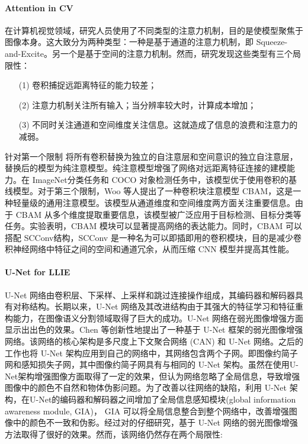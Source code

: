 \documentclass[a4paper, 10pt]{article}
\begin{document}
	\paragraph{Attention in CV}
	
	在计算机视觉领域，研究人员使用了不同类型的注意力机制，目的是使模型聚焦于图像本身。这大致分为两种类型：一种是基于通道的注意力机制，即 Squeeze-and-Excite。另一个是基于空间的注意力机制\cite{woo2018cbam}。然而，研究发现这些类型有三个局限性：
	
	\begin{itemize}
		\item[(1)] 
		卷积捕捉远距离特征的能力较差；
		
		\item[(2)]
		注意力机制关注所有输入；当分辨率较大时，计算成本增加；
		
		\item[(3)]
		不同时关注通道和空间维度关注信息。这就造成了信息的浪费和注意力的减弱。
	\end{itemize}	
	
	针对第一个限制 \cite{ramachandran2019stand} 将所有卷积替换为独立的自注意层和空间意识的独立自注意层，替换后的模型为纯注意模型。纯注意模型增强了网络对远距离特征连接的建模能力。在 ImageNet分类任务和 COCO 对象检测任务中，该模型优于使用卷积的基线模型。对于第三个限制，Woo 等人\cite{woo2018cbam}提出了一种卷积块注意模型 CBAM，这是一种轻量级的通用注意模型。该模型从通道维度和空间维度两方面关注重要信息。由于 CBAM 从多个维度提取重要信息，该模型被广泛应用于目标检测、目标分类等任务。实验表明，CBAM 模块可以显著提高网络的表达能力。同时，CBAM 可以搭配 SCConv\cite{li2023scconv}结构，SCConv 是一种名为可以即插即用的卷积模块，目的是减少卷积神经网络中特征之间的空间和通道冗余，从而压缩 CNN 模型并提高其性能。
	
	\paragraph{U-Net for LLIE}
	
	U-Net 网络由卷积层、下采样、上采样和跳过连接操作组成，其编码器和解码器具有对称结构。长期以来，U-Net 网络及其改进结构由于其强大的特征学习和特征重构能力，在图像语义分割领域取得了巨大的成功。U-Net 网络在弱光图像增强方面显示出出色的效果。Chen 等\cite{chen2018learning}创新性地提出了一种基于 U-Net 框架的弱光图像增强网络。该网络的核心架构是多尺度上下文聚合网络 (CAN) 和 U-Net 网络。之后的工作\cite{chen2018learning, zamir2021learning}也将 U-Net 架构应用到自己的网络中，其网络包含两个子网。即图像约简子网和感知损失子网，其中图像约简子网具有与\cite{chen2018learning}相同的 U-Net 架构。虽然\cite{chen2018learning, zamir2021learning}在使用U-Net架构增强图像方面取得了一定的效果，但\cite{meng2020gia}认为\cite{chen2018learning, zamir2021learning}网络忽略了全局信息，导致增强图像中的颜色不自然和物体伪影问题。为了改善以往网络的缺陷，利用 U-Net 架构，\cite{meng2020gia}在U-Net的编码器和解码器之间增加了全局信息感知模块(global information awareness module, GIA)， GIA 可以将全局信息整合到整个网络中，改善增强图像中的颜色不一致和伪影。经过对\cite{chen2018learning, meng2020gia, zamir2021learning}的仔细研究，基于 U-Net 网络的弱光图像增强方法取得了很好的效果。然而，该网络仍然存在两个局限性:
	
\end{document}
